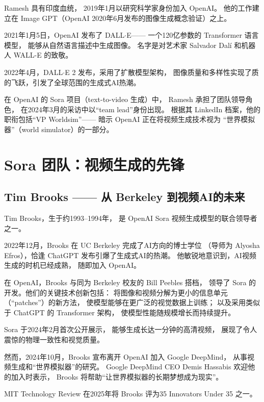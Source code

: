 Ramesh 具有印度血统，
2019年1月以研究科学家身份加入 OpenAI。
他的工作建立在 Image GPT（OpenAI 2020年6月发布的图像生成概念验证）之上。

2021年1月5日，OpenAI 发布了 DALL$\cdot$E——
一个120亿参数的 Transformer 语言模型，
能够从自然语言描述中生成图像。
名字是对艺术家 Salvador Dal\'{i} 和机器人 WALL-E 的致敬。

2022年4月，DALL$\cdot$E 2 发布，采用了扩散模型架构，
图像质量和多样性实现了质的飞跃，引发了全球范围的生成式AI热潮。

在 OpenAI 的 Sora 项目（text-to-video 生成）中，
Ramesh 承担了团队领导角色，
在2024年3月的采访中以``team lead''身份出现。
根据其 LinkedIn 档案，他的职衔包括``VP Worldsim''——
暗示 OpenAI 正在将视频生成技术视为
``世界模拟器''（world simulator）的一部分。


\section{Sora 团队：视频生成的先锋}
\label{sec:sora-team}

\subsection{Tim Brooks —— 从 Berkeley 到视频AI的未来}
\label{subsec:tim-brooks}

Tim Brooks，生于约1993--1994年，
是 OpenAI Sora 视频生成模型的联合领导者之一。

2022年12月，Brooks 在 UC Berkeley 完成了AI方向的博士学位
（导师为 Alyosha Efros），恰逢 ChatGPT 发布引爆了生成式AI的热潮。
他敏锐地意识到，AI视频生成的时机已经成熟，
随即加入 OpenAI。

在 OpenAI，Brooks 与同为 Berkeley 校友的 Bill Peebles 搭档，
领导了 Sora 的开发。他们的关键技术创新包括：
将图像和视频分解为更小的信息单元（``patches''）的新方法，
使模型能够在更广泛的视觉数据上训练；
以及采用类似于 ChatGPT 的 Transformer 架构，
使模型性能随规模增长而持续提升。

Sora 于2024年2月首次公开展示，
能够生成长达一分钟的高清视频，
展现了令人震惊的物理一致性和视觉质量。

然而，2024年10月，Brooks 宣布离开 OpenAI 加入 Google DeepMind，
从事视频生成和``世界模拟器''的研究。
Google DeepMind CEO Demis Hassabis 欢迎他的加入时表示，
Brooks 将帮助``让世界模拟器的长期梦想成为现实''。

MIT Technology Review 在2025年将 Brooks
评为35 Innovators Under 35 之一。


